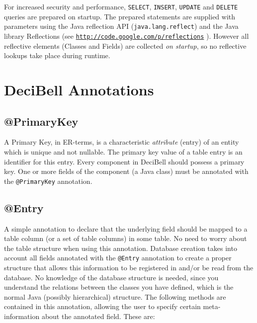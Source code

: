 \documentclass[a4paper,10pt]{article}
\begin{document}
For increased security and performance, \texttt{SELECT}, \texttt{INSERT},
\texttt{UPDATE} and \texttt{DELETE} queries are prepared on startup. The prepared
statements are supplied with parameters using the Java reflection API (\texttt{java.lang.reflect}) and
the Java library Reflections (see \href{http://code.google.com/p/reflections}{\texttt{http://code.google.com/p/reflections}} ). However all reflective 
elements (Classes and Fields) are collected \emph{on startup}, so no reflective lookups take place during runtime.

\section*{DeciBell Annotations}\label{annotations}
\subsection*{@PrimaryKey}\label{primarykey}
A Primary Key, in ER-terms, is a characteristic \textit{attribute} (entry) of an
entity which is unique and not nullable. The primary key value of a table entry is an 
identifier for this entry. Every component in DeciBell should possess a primary key. One or more
fields of the component (a Java class) must be annotated with the \texttt{@PrimaryKey} annotation.

\subsection*{@Entry}\label{entry}
A simple annotation to declare that the underlying field should be mapped to a table column (or a set of
table columns) in some table. No need to worry about the table structure when using this annotation.
Database creation takes into account all fields annotated with the \texttt{@Entry}
annotation to create a proper structure that allows this information to be registered
in and/or be read from the database. No knowledge of the database structure is needed,
since you understand the relations between the classes you have defined, which is the
normal Java (possibly hierarchical) structure. The following methods are contained in this 
annotation, allowing the user to specify certain meta-information
about the annotated field. These are:
\end{document}
